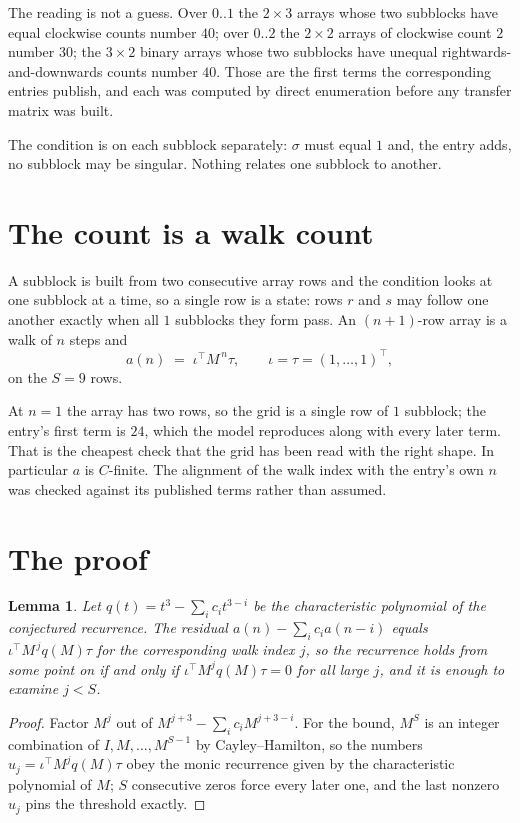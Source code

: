 \documentclass[11pt,a4paper]{article}
\theoremstyle{plain}
\newtheorem{lemma}[theorem]{Lemma}
\theoremstyle{definition}
\begin{document}
The reading is not a guess. Over $0..1$ the $2\times3$ arrays whose two subblocks have equal
clockwise counts number $40$; over $0..2$ the $2\times2$ arrays of clockwise count $2$ number
$30$; the $3\times2$ binary arrays whose two subblocks have unequal rightwards-and-downwards
counts number $40$. Those are the first terms the corresponding entries publish, and each was
computed by direct enumeration before any transfer matrix was built.

The condition is on each subblock separately: $\sigma$ must equal $1$ and, the entry adds, no subblock may be singular. Nothing
relates one subblock to another.

\section{The count is a walk count}

A subblock is built from two consecutive array rows and the condition looks
at one subblock at a time, so a single row is a state: rows $r$ and $s$ may follow one another
exactly when all $1$ subblocks they form pass. An $(n+1)$-row array is a walk of $n$ steps and
\[
a(n)\;=\;\iota^{\!\top}M^{\,n}\tau,\qquad\iota=\tau=(1,\dots,1)^{\!\top},
\]
on the $S=9$ rows.

At $n=1$ the array has two rows, so the grid is a single row of $1$
subblock; the entry's first term is $24$, which the model
reproduces along with every later term. That is the cheapest check that the grid has been read
with the right shape.
In particular $a$ is $C$-finite. The alignment of the walk index with the entry's own $n$ was
checked against its published terms rather than assumed.

\section{The proof}

\begin{lemma}\label{lem:crit}
Let $q(t)=t^{3}-\sum_i c_it^{3-i}$ be the characteristic polynomial of the
conjectured recurrence. The residual $a(n)-\sum_ic_ia(n-i)$ equals
$\iota^{\!\top}M^{\,j}q(M)\tau$ for the corresponding walk index $j$, so the recurrence
holds from some point on if and only if $\iota^{\!\top}M^{j}q(M)\tau=0$ for all large $j$,
and it is enough to examine $j<S$.
\end{lemma}

\begin{proof}
Factor $M^{j}$ out of $M^{j+3}-\sum_ic_iM^{j+3-i}$. For the bound, $M^{S}$
is an integer combination of $I,M,\dots,M^{S-1}$ by Cayley--Hamilton, so the numbers
$u_j=\iota^{\!\top}M^{j}q(M)\tau$ obey the monic recurrence given by the characteristic
polynomial of $M$; $S$ consecutive zeros force every later one, and the last nonzero $u_j$
pins the threshold exactly.
\end{proof}
\end{document}
